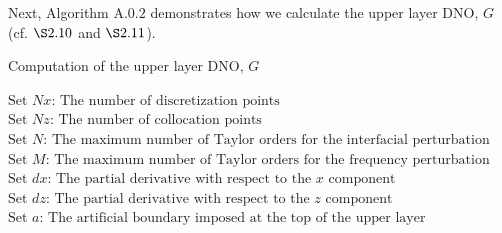 \vspace{-17mm}
Next, Algorithm $\text{A}.0.2$ demonstrates how we calculate the upper layer DNO, $G$ (cf. $\S 2.10$ and $\S 2.11$).
\vspace{-14mm}
\begin{algorithm}[H]
\caption{Computation of the upper layer DNO, $G$}
\label{alg:dno}
\begin{algorithmic}[1]
\State $\text{Set $Nx$: The number of discretization points}$
\State $\text{Set $Nz$: The number of collocation points}$
\State $\text{Set $N$: The maximum number of Taylor orders for the interfacial perturbation}$
\State $\text{Set $M$: The maximum number of Taylor orders for the frequency perturbation}$
\State $\text{Set $dx$: The partial derivative with respect to the $x$ component}$
\State $\text{Set $dz$: The partial derivative with respect to the $z$ component}$
\State $\text{Set $a$: The artificial boundary imposed at the top of the upper layer}$
\end{algorithmic}
\end{algorithm}


